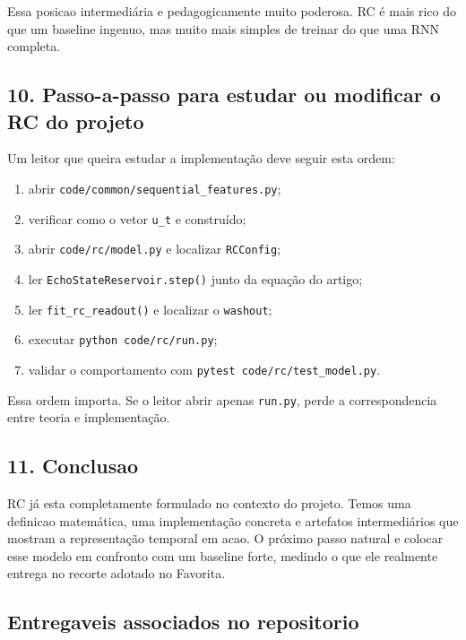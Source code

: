 \documentclass[12pt]{article}
\providecommand{\tightlist}{%
          \setlength{\itemsep}{0pt}\setlength{\parskip}{0pt}}
\begin{document}
Essa posicao intermediária e pedagogicamente muito poderosa. RC é mais rico do que um baseline ingenuo, mas muito mais simples de treinar do que uma RNN completa.

\subsection{10. Passo-a-passo para estudar ou modificar o RC do projeto}\label{10-passo-a-passo-para-estudar-ou-modificar-o-rc-do-projeto}

Um leitor que queira estudar a implementação deve seguir esta ordem:

\begin{enumerate}
\def\labelenumi{\arabic{enumi}.}
\tightlist
\item
  abrir \texttt{code/common/sequential\_features.py};
\item
  verificar como o vetor \texttt{u\_t} e construído;
\item
  abrir \texttt{code/rc/model.py} e localizar \texttt{RCConfig};
\item
  ler \texttt{EchoStateReservoir.step()} junto da equação do artigo;
\item
  ler \texttt{fit\_rc\_readout()} e localizar o \texttt{washout};
\item
  executar \texttt{python\ code/rc/run.py};
\item
  validar o comportamento com \texttt{pytest\ code/rc/test\_model.py}.
\end{enumerate}

Essa ordem importa. Se o leitor abrir apenas \texttt{run.py}, perde a correspondencia entre teoria e implementação.

\subsection{11. Conclusao}\label{11-conclusao}

RC já esta completamente formulado no contexto do projeto. Temos uma definicao matemática, uma implementação concreta e artefatos intermediários que mostram a representação temporal em acao. O próximo passo natural e colocar esse modelo em confronto com um baseline forte, medindo o que ele realmente entrega no recorte adotado no Favorita.

\subsection{Entregaveis associados no repositorio}\label{entregaveis-associados-no-repositorio}
\end{document}
